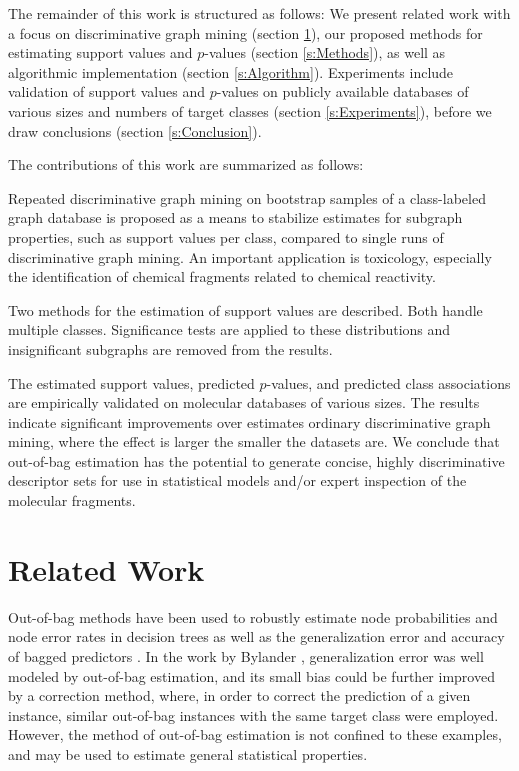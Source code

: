 \documentclass{article}
\begin{document}
The remainder of this work is structured as follows: We present related work
with a focus on discriminative graph mining (section \ref{s:relatedWork}),
our proposed methods for estimating support values and $p$-values (section
\ref{s:Methods}), as well as algorithmic implementation
(section \ref{s:Algorithm}). Experiments include validation of support
values and $p$-values on publicly available databases of
various sizes and numbers of target classes (section \ref{s:Experiments}),
before we draw conclusions (section \ref{s:Conclusion}).

The contributions of this work are summarized as follows:
\begin{itemize*}
  \item Repeated discriminative graph mining on bootstrap samples of a
    class-labeled graph database is proposed as a means to stabilize estimates
    for subgraph properties, such as support values per class, compared to
    single runs of discriminative graph mining. An important application is
    toxicology, especially the identification of chemical fragments related to
    chemical reactivity.
  \item Two methods for the estimation of support values are described. Both
    handle multiple classes. Significance tests are applied to these
    distributions and insignificant subgraphs are removed from the results.  
  \item The estimated support values, predicted $p$-values, and predicted class
    associations are empirically validated on molecular databases of various
    sizes.  The results indicate significant improvements over estimates
    ordinary discriminative graph mining, where the effect is larger the
    smaller the datasets are.  We conclude that out-of-bag estimation has the
    potential to generate concise, highly discriminative descriptor sets for
    use in statistical models and/or expert inspection of the molecular
    fragments.
\end{itemize*}


\section{Related Work}
\label{s:relatedWork}

Out-of-bag methods have been used to robustly estimate node probabilities and
node error rates in decision trees \cite{breiman96oob} as well as the
generalization error and accuracy of bagged predictors
\cite{bylander02estimating}. In the work by Bylander
\cite{bylander02estimating}, generalization error was well modeled by
out-of-bag estimation, and its small bias could be further improved by a
correction method, where, in order to correct the prediction of a given
instance, similar out-of-bag instances with the same target class were
employed. However, the method of out-of-bag estimation is not confined to these
examples, and may be used to estimate general statistical properties.
\end{document}
